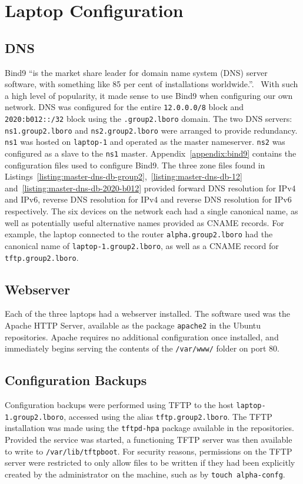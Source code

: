 \chapter{Laptop Configuration}
\section{DNS}
    Bind9 ``is the market share leader for domain name system (DNS) server software,
    with something like 85 per cent of installations worldwide.''.~\cite{Mohan2010}
    With such a high level of popularity, it made sense to use Bind9 when configuring
    our own network. DNS was configured for the entire \texttt{12.0.0.0/8} block and \texttt
    {2020:b012::/32} block using the \texttt{.group2.lboro} domain. The two DNS
    servers: \texttt{ns1.group2.lboro} and \texttt{ns2.group2.lboro} were
    arranged to provide redundancy.
    \texttt{ns1} was hosted on \texttt{laptop-1} and operated as the master
    nameserver. \texttt{ns2} was configured as a slave to the \texttt{ns1}
    master. Appendix~\ref{appendix:bind9} contains the configuration files used
    to configure Bind9. The three zone files found in
    Listings~\ref {listing:master-dns-db-group2},~\ref{listing:master-dns-db-12} and~\ref {listing:master-dns-db-2020-b012} provided forward DNS
    resolution for IPv4 and IPv6, reverse DNS resolution for IPv4 and reverse
    DNS resolution for IPv6 respectively. The six devices on the network each
    had a single canonical name, as well as potentially useful alternative
    names provided as CNAME records. For example, the laptop connected to the
    router \texttt{alpha.group2.lboro} had the canonical name of
    \texttt{laptop-1.group2.lboro}, as well as a CNAME record for
    \texttt{tftp.group2.lboro}.
\section{Webserver}
    Each of the three laptops had a webserver installed. The software used was
    the Apache HTTP Server, available as the package \texttt{apache2} in the
    Ubuntu repositories. Apache requires no additional configuration once
    installed, and immediately begins serving the contents of the \texttt
    {/var/www/} folder on port 80.
\section{Configuration Backups}
    Configuration backups were performed using TFTP to the host \texttt
    {laptop-1.group2.lboro}, accessed using the alias \texttt
    {tftp.group2.lboro}. The TFTP installation was made using the \texttt
    {tftpd-hpa} package available in the repositories. Provided the service was
    started, a functioning TFTP server was then available to write to \texttt
    {/var/lib/tftpboot}. For security reasons, permissions on the TFTP server
    were restricted to only allow files to be written if they had been
    explicitly created by the administrator on the machine, such as by
    \texttt{touch alpha-confg}.
